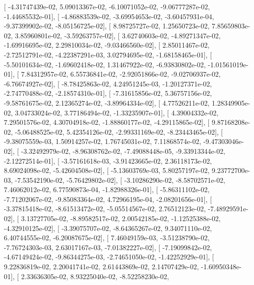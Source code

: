 \documentclass{article}
\begin{document}
       [ -4.31747439e-02,   5.09013367e-02,  -6.10071052e-02,
         -9.06777287e-02,  -1.44685532e-01],
       [ -4.86883539e-02,  -3.69954653e-02,  -3.60457931e-04,
         -9.37399902e-02,  -8.05156725e-02],
       [  8.98725727e-02,   1.25650723e-02,   7.85659803e-02,
          3.85960801e-02,  -3.59263757e-02],
       [  3.62740603e-02,  -4.89271347e-02,  -1.69916695e-02,
          2.29810034e-02,  -9.03466560e-02],
       [  2.85011467e-02,  -2.72512791e-02,  -4.22387291e-03,
          3.02794695e-02,  -1.68158465e-01],
       [ -5.50101634e-02,  -1.69602418e-02,   1.31467922e-02,
         -6.93830802e-02,  -1.01561019e-01],
       [  7.84312957e-02,   6.55736841e-02,  -2.92051866e-02,
         -9.02706937e-02,  -6.76674927e-02],
       [ -8.78425863e-02,   4.24951245e-03,  -1.20127371e-02,
         -2.74770488e-02,  -2.18574310e-01],
       [ -7.31615856e-02,   5.36757156e-02,  -9.58761675e-02,
          2.12365274e-02,  -3.89964334e-02],
       [  4.77526211e-02,   1.28349905e-02,   3.04733024e-02,
          3.77186494e-02,  -1.33235907e-01],
       [  4.39004332e-02,   7.29501576e-02,   4.30704918e-02,
         -1.88860177e-02,  -4.29115865e-02],
       [  9.87168208e-02,  -5.06488525e-02,   5.42354126e-02,
         -2.99331169e-02,  -8.23443465e-02],
       [ -9.38075559e-03,   1.50914257e-02,   1.76745031e-02,
          7.11868574e-02,  -9.47303046e-02],
       [ -3.32492979e-02,  -8.96308762e-02,  -7.49088448e-05,
         -9.33913344e-02,  -2.12272514e-01],
       [ -3.57161618e-03,  -3.91423665e-02,   2.36118173e-02,
          8.69024098e-02,  -5.42604508e-02],
       [ -5.13603769e-03,   5.80257197e-02,   9.23772700e-03,
         -7.53542190e-02,  -5.76429802e-02],
       [ -3.10286290e-02,  -8.58702571e-02,   7.46062012e-02,
          6.77590873e-04,  -1.82988326e-01],
       [ -5.86311102e-02,  -7.71202067e-02,  -9.85083364e-02,
          4.72966195e-04,  -2.08201656e-01],
       [ -3.37815418e-02,  -8.61513472e-02,  -5.05514567e-02,
          2.76512123e-02,  -7.48929591e-02],
       [  3.13727705e-02,  -8.89582517e-02,   2.00542185e-02,
         -1.12525388e-02,  -4.32910125e-02],
       [ -3.39075707e-02,  -8.64365267e-02,   9.34071110e-02,
          6.40744555e-02,  -6.20087675e-02],
       [  7.46049159e-03,  -3.51238790e-02,  -7.76724303e-03,
          2.63017167e-03,  -7.01382227e-02],
       [ -7.19099842e-02,  -4.67149424e-02,  -9.86344275e-03,
         -2.74651050e-02,  -1.42252929e-01],
       [  9.22836819e-02,   2.20041741e-02,   2.61443869e-02,
          2.14707429e-02,  -1.60950348e-01],
       [  2.33636305e-02,   8.93225040e-02,  -8.52258230e-02,
\end{document}

